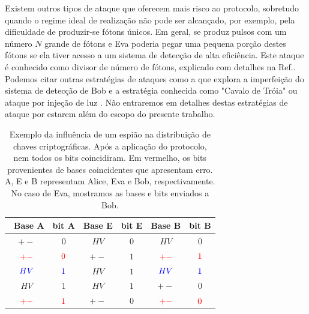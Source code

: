 \documentclass[pra, twocolumn]{revtex4}
\begin{document}
	Existem outros tipos de ataque que oferecem mais risco ao protocolo, sobretudo quando o regime ideal de realiza\c c\~ao n\~ao pode ser alcan\c cado, por exemplo, pela dificuldade de produzir-se f\'otons \'unicos. Em geral, se produz pulsos com um n\'umero $N$ grande de f\'otons e  Eva poderia pegar uma pequena por\c c\~ao destes f\'otons se ela tiver acesso a um sistema de detec\c c\~ao de alta efici\^encia. Este ataque \'e conhecido como divisor de n\'umero de f\'otons, explicado com detalhes na Ref.\cite{PNS}. Podemos citar outras estrat\'egias de ataques como a que explora a imperfei\c c\~ao do sistema de detec\c c\~ao de Bob \cite{FS} e a estrat\'egia conhecida como "Cavalo de Tr\'oia" ou ataque por inje\c c\~ao de luz \cite{CT}. N\~ao entraremos em detalhes destas estrat\'egias de ataque por estarem al\'em do escopo do presente trabalho.       

\begin{table}[h]
  \begin{center}
  \begin{tabular}{ |c|c|c|c|c|c|}
   \hline
   \ Base A & bit A & Base E & bit E & Base B & bit B \\
   \hline
       $+-$ & $0$ & $HV$ & $0$ & $HV$ & $0$  \\ \hline
      $\mathbf{\textcolor{red}{+-}}$ & \textbf{$\textcolor{red}{0}$} & ${+-}$ & ${1}$ & \textbf{$\textcolor{red}{+-}$} & \textbf{$\textcolor{red}{1}$}  \\ \hline
       \textbf{$\textcolor{blue}{HV}$} & \textbf{$\textcolor{blue}{1}$} & $HV$ & $1$ & \textbf{$\textcolor{blue}{HV}$} & \textbf{$\textcolor{blue}{1}$}  \\ \hline
       $HV$ & $1$ & $HV$ & $1$ & $+-$ & $0$  \\ \hline
       \textbf{$\textcolor{red}{+-}$} & \textbf{$\textcolor{red}{1}$} & $+-$ & $0$ & \textbf{$\textcolor{red}{+-}$} & \textbf{$\textcolor{red}{0}$}  \\ \hline
   \end{tabular}
       \caption{Exemplo da influ\^encia de um espi\~ao na distribui\c c\~ao de chaves criptogr\'aficas. Ap\'os a aplica\c c\~ao do protocolo, nem todos os bits coincidiram. Em vermelho, os bits provenientes de bases coincidentes que apresentam erro. A, E e B representam Alice, Eva e Bob, respectivamente. No caso de Eva, mostramos as bases e bits enviados a Bob.}
        \label{Tabela2}
  \end{center}
  \end{table} 	
\end{document}
